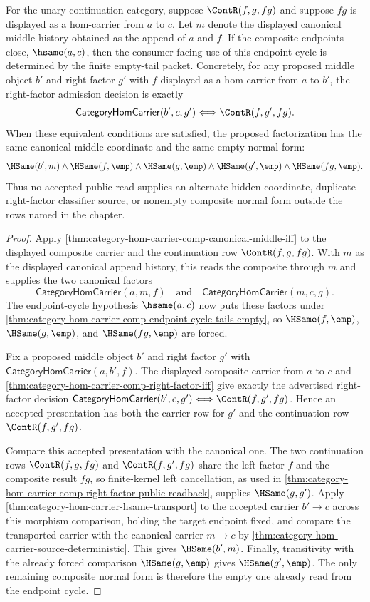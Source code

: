 \begin{corollary}
\label{cor:category-hom-carrier-comp-endpoint-cycle-empty-determinacy}
For the unary-continuation category, suppose $\ContR(f,g,fg)$ and suppose $fg$
is displayed as a hom-carrier from $a$ to $c$. Let $m$ denote the displayed
canonical middle history obtained as the append of $a$ and $f$. If the composite
endpoints close, $\hsame(a,c)$, then the consumer-facing use of this endpoint
cycle is determined by the finite empty-tail packet. Concretely, for any
proposed middle object $b'$ and right factor $g'$ with $f$ displayed as a
hom-carrier from $a$ to $b'$, the right-factor admission decision is exactly
$$
\mathsf{CategoryHomCarrier}(b',c,g')
\Longleftrightarrow
\ContR(f,g',fg).
$$
When these equivalent conditions are satisfied, the proposed factorization has
the same canonical middle coordinate and the same empty normal form:
$$
\HSame(b',m)\wedge
\HSame(f,\emp)\wedge
\HSame(g,\emp)\wedge
\HSame(g',\emp)\wedge
\HSame(fg,\emp).
$$
Thus no accepted public read supplies an alternate hidden coordinate, duplicate
right-factor classifier source, or nonempty composite normal form outside the
rows named in the chapter.
\end{corollary}
\begin{proof}
Apply \autoref{thm:category-hom-carrier-comp-canonical-middle-iff} to the
displayed composite carrier and the continuation row $\ContR(f,g,fg)$. With
$m$ as the displayed canonical append history, this reads the composite through
$m$ and supplies the two canonical factors
$$
\mathsf{CategoryHomCarrier}(a,m,f)
\quad\text{and}\quad
\mathsf{CategoryHomCarrier}(m,c,g).
$$
The endpoint-cycle hypothesis $\hsame(a,c)$ now puts these factors under
\autoref{thm:category-hom-carrier-comp-endpoint-cycle-tails-empty}, so
$\HSame(f,\emp)$, $\HSame(g,\emp)$, and $\HSame(fg,\emp)$ are forced.

Fix a proposed middle object $b'$ and right factor $g'$ with
$\mathsf{CategoryHomCarrier}(a,b',f)$. The displayed composite carrier from
$a$ to $c$ and \autoref{thm:category-hom-carrier-comp-right-factor-iff} give
exactly the advertised right-factor decision
$\mathsf{CategoryHomCarrier}(b',c,g')\Longleftrightarrow\ContR(f,g',fg)$.
Hence an accepted presentation has both the carrier row for $g'$ and the
continuation row $\ContR(f,g',fg)$.

Compare this accepted presentation with the canonical one. The two continuation
rows $\ContR(f,g,fg)$ and $\ContR(f,g',fg)$ share the left factor $f$ and the
composite result $fg$, so finite-kernel left cancellation, as used in
\autoref{thm:category-hom-carrier-comp-right-factor-public-readback}, supplies
$\HSame(g,g')$. Apply
\autoref{thm:category-hom-carrier-hsame-transport} to the accepted carrier
$b'\to c$ across this morphism comparison, holding the target endpoint fixed,
and compare the transported carrier with the canonical carrier $m\to c$ by
\autoref{thm:category-hom-carrier-source-deterministic}. This gives
$\HSame(b',m)$. Finally, transitivity with the already forced comparison
$\HSame(g,\emp)$ gives $\HSame(g',\emp)$. The only remaining composite normal
form is therefore the empty one already read from the endpoint cycle.
\end{proof}
